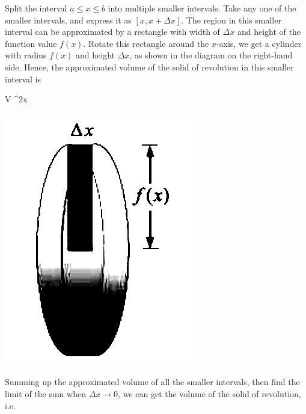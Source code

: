 \vspace{0.5cm}
\begin{vwcol}[widths={0.7,0.3},justify=flush,rule=0pt,indent=1em]

    Split the interval $a \leq x \leq b$ into multiple smaller intervals. Take any
    one of the smaller intervals, and express it as $[x, x + \Delta x]$. The region
    in this smaller interval can be approximated by a rectangle with width of
    $\Delta x$ and height of the function value $f(x)$. Rotate this rectangle
    around the $x$-axis, we get a cylinder with radius $f(x)$ and height $\Delta
        x$, as shown in the diagram on the right-hand side. Hence, the approximated
    volume of the solid of revolution in this smaller interval is
    \begin{cequation}
        \Delta V \approx \pi[f(x)]^2\Delta x
    \end{cequation}

    \includegraphics[scale=0.3]{assets/28-22b.png}
\end{vwcol}
\vspace{0.5cm}
Summing up the approximated volume of all the smaller intervals, then find the
limit of the sum when $\Delta x \to 0$, we can get the volume of the solid of
revolution, i.e.
\begin{center}
\end{center}
